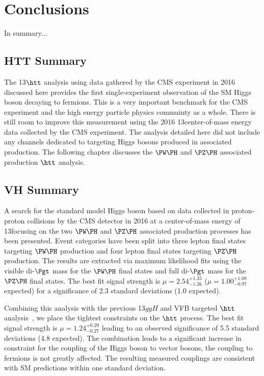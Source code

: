 \chapter{Conclusions}

In summary...

\section{HTT Summary}
The 13\TeV $\htt$ analysis using data gathered by the CMS experiment in 2016 discussed here provides the first 
single-experiment observation of the SM Higgs boson decaying to fermions. This is a very important benchmark for the CMS
experiment and the high energy particle physics commuinty as a whole. There is still room to improve this
measurement using the 2016 13\TeV center-of-mass energy data collected by the CMS experiment. The analysis
detailed here did not include any channels dedicated to targeting Higgs bosons produced in associated production.
The following chapter discusses the $\PW\PH$ and $\PZ\PH$ associated production $\htt$ analysis.



\section{VH Summary}
A search for the standard model Higgs boson based on data collected in proton-proton collisions by the
CMS detector in 2016 at a center-of-mass energy of 13\TeV focusing on the
two $\PW\PH$ and $\PZ\PH$ associated production processes has been presented. Event
categories have been split into three lepton final states targeting $\PW\PH$ production
and four lepton final states targeting $\PZ\PH$ production. The results are extracted
via maximum likelihood fits using the visible di-$\Pgt$ mass for the $\PW\PH$
final states and full di-$\Pgt$ mass for the $\PZ\PH$ final states. 
The best fit signal
strength is $\mu = 2.54 ^{+1.35} _{-1.26}$ ($\mu = 1.00 ^{+1.08} _{-0.97}$ expected) 
for a significance of 2.3 standard deviations (1.0 expected).

Combining this analysis with the previous 13\TeV $ggH$ and VFB targeted $\htt$ 
analysis~\cite{cms_13TeV_htt_jhep_2017}, we place the tightest constraints
on the $\htt$ process. 
The best fit signal strength is $\mu = 1.24 ^{+0.29} _{-0.27}$ leading to an
observed significance of 5.5 standard deviations (4.8 expected). 
The combination leads to a significant increase in constraint for the coupling
of the Higgs boson to vector bosons, the coupling to fermions is not greatly
affected. The resulting measured couplings are consistent with SM predictions
within one standard deviation.
